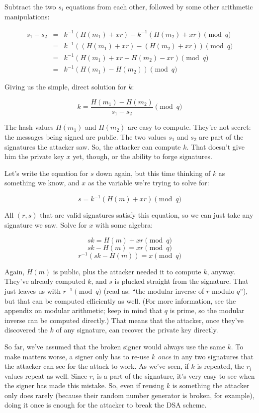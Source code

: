\documentclass[11pt,ebook,table,dvipsnames]{memoir}
\begin{document}
Subtract the two $s_i$ equations from each other, followed by some
other arithmetic manipulations:

\begin{eqnarray*}
s_1 - s_2 & = & k^{-1} (H(m_1) + xr) - k^{-1} (H(m_2) + xr) \pmod q \\
& = & k^{-1} \left( (H(m_1) + xr) - (H(m_2) + xr) \right) \pmod q \\
& = & k^{-1} (H(m_1) + xr - H(m_2) - xr) \pmod q \\
& = & k^{-1} (H(m_1) - H(m_2)) \pmod q
\end{eqnarray*}

Giving us the simple, direct solution for $k$:

\[
k = \frac{H(m_1) - H(m_2)}{s_1 - s_2} \pmod q
\]

The hash values $H(m_1)$ and $H(m_2)$ are easy to compute. They're not
secret: the messages being signed are public. The two values $s_1$ and
$s_2$ are part of the signatures the attacker saw. So, the attacker
can compute $k$. That doesn't give him the private key $x$ yet,
though, or the ability to forge signatures.

Let's write the equation for $s$ down again, but this time thinking of
$k$ as something we know, and $x$ as the variable we're trying to
solve for:

\[
s = k^{-1} (H(m) + xr) \pmod q
\]

All $(r, s)$ that are valid signatures satisfy this equation, so we
can just take any signature we saw. Solve for $x$ with some algebra:

\[
sk = H(m) + xr \pmod q
\]
\[
sk - H(m) = xr \pmod q
\]
\[
r^{-1}(sk - H(m)) = x \pmod q
\]

Again, $H(m)$ is public, plus the attacker needed it to compute $k$,
anyway. They've already computed $k$, and $s$ is plucked straight from
the signature. That just leaves us with $r^{-1} \pmod q$ (read as:
\enquote{the modular inverse of $r$ modulo $q$}), but that can be computed
efficiently as well. (For more information, see the appendix on
modular arithmetic; keep in mind that $q$ is prime, so the modular
inverse can be computed directly.) That means that the attacker, once
they've discovered the $k$ of any signature, can recover the private
key directly.

So far, we've assumed that the broken signer would always use the same
$k$. To make matters worse, a signer only has to re-use $k$ \emph{once} in
any two signatures that the attacker can see for the attack to work.
As we've seen, if $k$ is repeated, the $r_i$ values repeat as well.
Since $r_i$ is a part of the signature, it's very easy to see when the
signer has made this mistake. So, even if reusing $k$ is something the
attacker only does rarely (because their random number generator is
broken, for example), doing it once is enough for the attacker to
break the DSA scheme.
\end{document}
